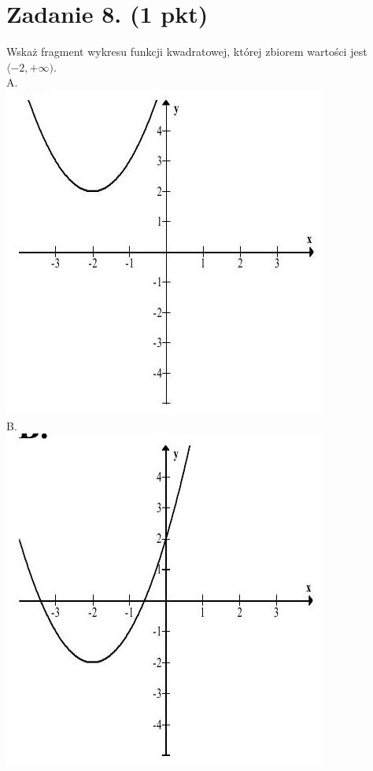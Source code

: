 \documentclass[10pt]{article}
\begin{document}
\section*{Zadanie 8. (1 pkt)}
Wskaż fragment wykresu funkcji kwadratowej, której zbiorem wartości jest \(\langle-2,+\infty)\).\\
A.\\
\includegraphics[max width=\textwidth, center]{2024_11_21_6a8be49478f78d0689cfg-04(2)}\\
B.\\
\includegraphics[max width=\textwidth, center]{2024_11_21_6a8be49478f78d0689cfg-04(1)}\\
\end{document}
